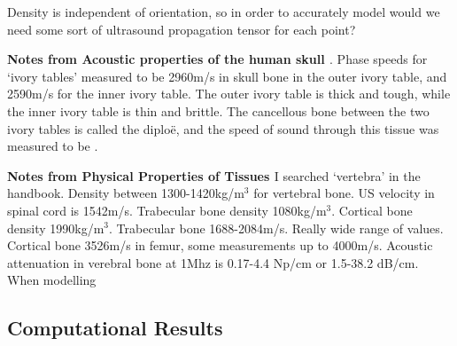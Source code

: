 \documentclass[11pt,titlepage]{article} %
\begin{document}
Density is independent of orientation, so in order to accurately model would we need some sort of ultrasound propagation tensor for each point? 

\textbf{Notes from Acoustic properties of the human skull \cite{ fry1978acoustical}}.
Phase speeds for `ivory tables' measured to be 2960m/s in skull bone in the outer ivory table, and 2590m/s for the inner ivory table. The outer ivory table is thick and tough, while the inner ivory table is thin and brittle. The cancellous bone between the two ivory tables is called the diploë, and the speed of sound through this tissue was measured to be  .

\textbf{Notes from Physical Properties of Tissues \cite{duck1990physical}}
I searched `vertebra' in the handbook. Density between 1300-1420kg/m$^3$ for vertebral bone. US velocity in spinal cord is 1542m/s. Trabecular bone density 1080kg/m$^3$. Cortical bone density 1990kg/m$^3$. Trabecular bone 1688-2084m/s. Really wide range of values. Cortical bone 3526m/s in femur, some measurements up to 4000m/s. Acoustic attenuation in verebral bone at 1Mhz is 0.17-4.4 Np/cm or 1.5-38.2 dB/cm. When modelling 


\subsection{Computational Results}
\end{document}
